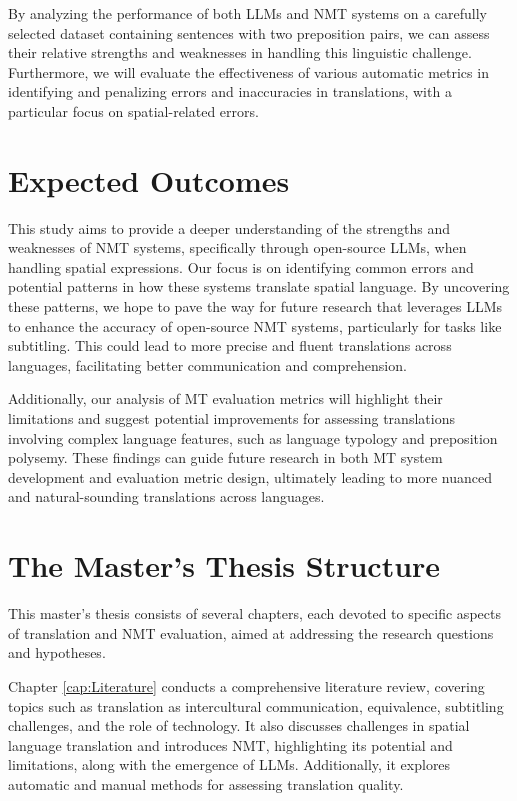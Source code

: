 By analyzing the performance of both LLMs and NMT systems on a carefully selected dataset containing sentences with two preposition pairs, we can assess their relative strengths and weaknesses in handling this linguistic challenge. Furthermore, we will evaluate the effectiveness of various automatic metrics in identifying and penalizing errors and inaccuracies in translations, with a particular focus on spatial-related errors.


\section{Expected Outcomes}

This study aims to provide a deeper understanding of the strengths and weaknesses of NMT systems, specifically through open-source LLMs, when handling spatial expressions. Our focus is on identifying common errors and potential patterns in how these systems translate spatial language. By uncovering these patterns, we hope to pave the way for future research that leverages LLMs to enhance the accuracy of open-source NMT systems, particularly for tasks like subtitling. This could lead to more precise and fluent translations across languages, facilitating better communication and comprehension.

Additionally, our analysis of MT evaluation metrics will highlight their limitations and suggest potential improvements for assessing translations involving complex language features, such as language typology and preposition polysemy. These findings can guide future research in both MT system development and evaluation metric design, ultimately leading to more nuanced and natural-sounding translations across languages.


\section{The Master's Thesis Structure} 

This master's thesis consists of several chapters, each devoted to specific aspects of translation and NMT evaluation, aimed at addressing the research questions and hypotheses.

Chapter \ref{cap:Literature}
conducts a comprehensive literature review, covering topics such as translation as intercultural communication, equivalence, subtitling challenges, and the role of technology. It also discusses challenges in spatial language translation and introduces NMT, highlighting its potential and limitations, along with the emergence of LLMs. Additionally, it explores automatic and manual methods for assessing translation quality.

